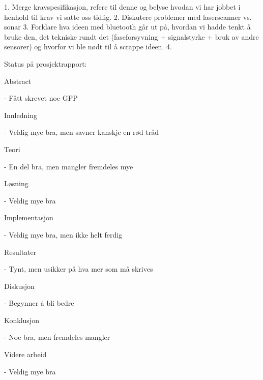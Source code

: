 1. Merge kravspesifikasjon, refere til denne og belyse hvodan vi har jobbet i henhold til krav vi satte oss tidlig.
2. Diskutere problemer med laserscanner vs. sonar
3. Forklare hva ideen med bluetooth går ut på, hvordan vi hadde tenkt å bruke den, det tekniske rundt det (faseforsyvning + signalstyrke + bruk av andre sensorer) og hvorfor vi ble nødt til å scrappe ideen.
4. 


Status på prosjektrapport:

Abstract

- Fått skrevet noe GPP

Innledning

-	Veldig mye bra, men savner kanskje en rød tråd

Teori

-	En del bra, men mangler fremdeles mye

Løsning

-	Veldig mye bra

Implementasjon

-	Veldig mye bra, men ikke helt ferdig

Resultater

-	Tynt, men usikker på hva mer som må skrives

Diskusjon

-	Begynner å bli bedre

Konklusjon

-	Noe bra, men fremdeles mangler

Videre arbeid

-	Veldig mye bra
